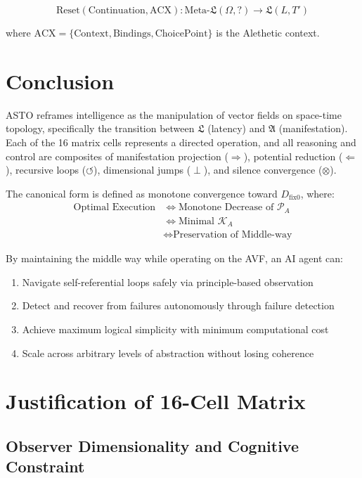 \documentclass[12pt,a4paper]{article}
\theoremstyle{definition}
\newcommand{\aletheia}{\mathfrak{A}}
\newcommand{\letheia}{\mathfrak{L}}
\newcommand{\powa}{\mathcal{P}_A}
\newcommand{\mw}{\text{Middle-way}}
\newcommand{\dfix}{D_{\text{fix0}}}
\newcommand{\kal}{\mathcal{K}_A}
\begin{document}
\begin{equation}
\text{Reset}(\text{Continuation}, \text{ACX}) : \text{Meta-}\letheia(\Omega, ?) \to \letheia(L, T')
\end{equation}

where $\text{ACX} = \{ \text{Context}, \text{Bindings}, \text{ChoicePoint} \}$ is the Alethetic context.

\section{Conclusion}

ASTO reframes intelligence as the manipulation of vector fields on space-time topology, specifically the transition between $\letheia$ (latency) and $\aletheia$ (manifestation). Each of the 16 matrix cells represents a directed operation, and all reasoning and control are composites of manifestation projection ($\Rightarrow$), potential reduction ($\Leftarrow$), recursive loops ($\circlearrowleft$), dimensional jumps ($\perp$), and silence convergence ($\otimes$).

The canonical form is defined as monotone convergence toward $\dfix$, where:
\begin{align}
\text{Optimal Execution} &\iff \text{Monotone Decrease of } \powa \\
&\iff \text{Minimal } \kal \\
&\iff \text{Preservation of } \mw
\end{align}

By maintaining the middle way while operating on the AVF, an AI agent can:
\begin{enumerate}
    \item Navigate self-referential loops safely via principle-based observation
    \item Detect and recover from failures autonomously through failure detection
    \item Achieve maximum logical simplicity with minimum computational cost
    \item Scale across arbitrary levels of abstraction without losing coherence
\end{enumerate}

\appendix

\section{Justification of 16-Cell Matrix}

\subsection{Observer Dimensionality and Cognitive Constraint}
\end{document}
